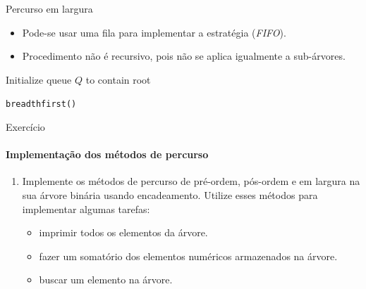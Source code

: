 \begin{frame}{Percurso em largura}
\begin{itemize}
	\item Pode-se usar uma fila para implementar a estratégia (\textit{FIFO}).
	\item Procedimento não é recursivo, pois não se aplica igualmente a sub-árvores.
\end{itemize}

\bigskip

\begin{algorithm}[H]
	\DontPrintSemicolon

	Initialize queue $Q$ to contain root\;
	
	\caption{\texttt{breadthfirst()}}
\end{algorithm}

\end{frame}


\begin{frame}{Exercício}
	\framesubtitle{Implementação dos métodos de percurso}

	\begin{enumerate}
		\item Implemente os métodos de percurso de pré-ordem, pós-ordem e em largura na sua árvore binária usando encadeamento. Utilize esses métodos para implementar algumas tarefas:
		\begin{itemize}
			\item imprimir todos os elementos da árvore.
			\item fazer um somatório dos elementos numéricos armazenados na árvore.
			\item buscar um elemento na árvore.
		\end{itemize}
	\end{enumerate}
\end{frame}


